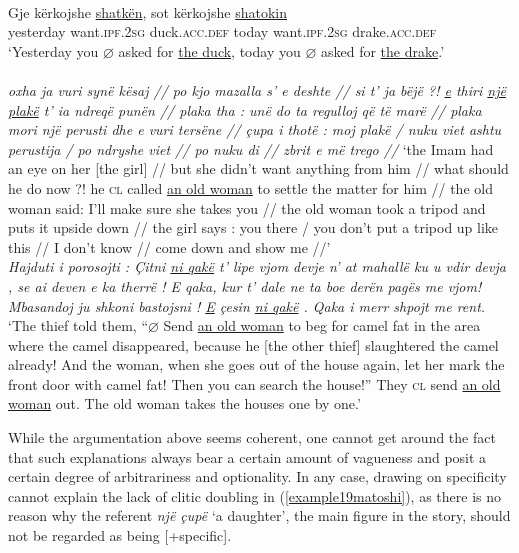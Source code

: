 \documentclass[output=paper]{langsci/langscibook}
\begin{document}
\ea \label{example16matoshi} 
	\\
	\gll Gje kërkojshe \uline{shatkën}, sot kërkojshe \uline{shatokin}\\
	yesterday want\textsc{.ipf.2sg} duck\textsc{.acc.def} today want.\textsc{ipf.2sg} drake.\textsc{acc.def}\\
	\glt ‘Yesterday you $\varnothing$ asked for \uline{the duck}, today you $\varnothing$ asked for \uline{the drake}.’\\
\ex \label{example17matoshi} 
	\\
	\textit{oxha ja vuri synë kësaj // po kjo mazalla s’ e deshte // si t’ ja bëjë ?! \uline{e} thiri \uline{një plakë} t’ ia ndreqë punën // plaka tha : unë do ta regulloj që të marë // plaka mori një perusti dhe e vuri tersëne // çupa i thotë : moj plakë / nuku viet ashtu perustija / po ndryshe viet // po nuku di // zbrit e më trego //}
	\glt ‘the Imam had an eye on her [the girl] // but she didn't want anything from him // what should he do now ?! he \textsc{cl} called \uline{an old woman} to settle the matter for him // the old woman said: I'll make sure she takes you // the old woman took a tripod and puts it upside down // the girl says : you there / you don't put a tripod up like this // I don't know // come down and show me //’
\ex \label{example18matoshi} 
	\\
	\textit{Hajduti i porosojti : Çitni \uline{ni qakë} t’ lipe vjom devje n’ at mahallë ku u vdir devja , se ai deven e ka therrë ! E qaka, kur t’ dale ne ta boe derën pagës me vjom! Mbasandoj ju shkoni bastojsni ! \uline{E} çesin \uline{ni qakë} . Qaka i merr shpojt me rent.}
	\glt ‘The thief told them, \enquote{$\varnothing$ Send \uline{an old woman} to beg for camel fat in the area where the camel disappeared, because he [the other thief] slaughtered the camel already! And the woman, when she goes out of the house again, let her mark the front door with camel fat! Then you can search the house!} They \textsc{cl} send \uline{an old woman} out. The old woman takes the houses one by one.’
 \z

While the argumentation above seems coherent, one cannot get around the fact that such explanations always bear a certain amount of vagueness and posit a certain degree of arbitrariness and optionality. In any case, drawing on specificity cannot explain the lack of clitic doubling in (\ref{example19matoshi}), as there is no reason why the referent \textit{një çupë} ‘a daughter’, the main figure in the story, should not be regarded as being [+specific]. 
\end{document}
